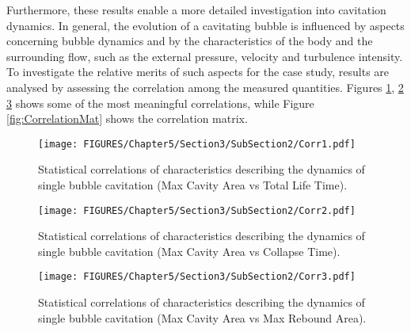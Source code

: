 Furthermore, these results enable a more detailed investigation into cavitation dynamics. 
In general, the evolution of a cavitating bubble is influenced by aspects concerning bubble dynamics and by the characteristics of the body and the surrounding flow, such as the external pressure, velocity and turbulence intensity. 
To investigate the relative merits of such aspects for the case study, results are analysed by assessing the correlation among the measured quantities.
Figures \ref{fig:Corr1}, \ref{fig:Corr2} \ref{fig:Corr3} shows some of the most meaningful correlations, while Figure \ref{fig:CorrelationMat} shows the correlation matrix.

\begin{figure}[h!]
    \centering
    \texttt{[image: FIGURES/Chapter5/Section3/SubSection2/Corr1.pdf]}
    \caption{Statistical correlations of characteristics describing the dynamics of single bubble cavitation (Max Cavity Area vs Total Life Time).}
    \label{fig:Corr1}
\end{figure}

\begin{figure}[h!]
    \centering
    \texttt{[image: FIGURES/Chapter5/Section3/SubSection2/Corr2.pdf]}
    \caption{Statistical correlations of characteristics describing the dynamics of single bubble cavitation (Max Cavity Area vs Collapse Time).}
    \label{fig:Corr2}
\end{figure}

\begin{figure}[h!]
    \centering
    \texttt{[image: FIGURES/Chapter5/Section3/SubSection2/Corr3.pdf]}
    \caption{Statistical correlations of characteristics describing the dynamics of single bubble cavitation (Max Cavity Area vs Max Rebound Area).}
    \label{fig:Corr3}
\end{figure}

